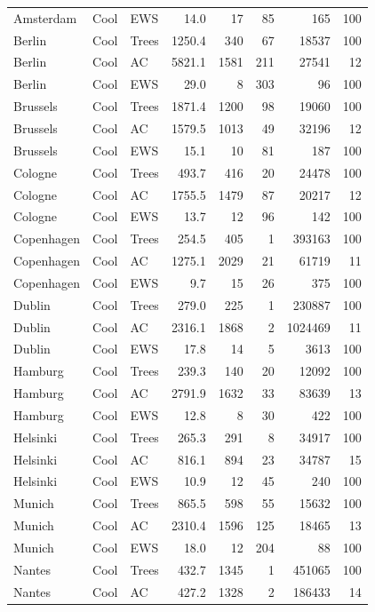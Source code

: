 \begin{longtable}{lllrrrrr}
  Amsterdam & Cool & EWS & 14.0 & 17 & 85 & 165 & 100 \\ 
  Berlin & Cool & Trees & 1250.4 & 340 & 67 & 18537 & 100 \\ 
  Berlin & Cool & AC & 5821.1 & 1581 & 211 & 27541 & 12 \\ 
  Berlin & Cool & EWS & 29.0 & 8 & 303 & 96 & 100 \\ 
  Brussels & Cool & Trees & 1871.4 & 1200 & 98 & 19060 & 100 \\ 
  Brussels & Cool & AC & 1579.5 & 1013 & 49 & 32196 & 12 \\ 
  Brussels & Cool & EWS & 15.1 & 10 & 81 & 187 & 100 \\ 
  Cologne & Cool & Trees & 493.7 & 416 & 20 & 24478 & 100 \\ 
  Cologne & Cool & AC & 1755.5 & 1479 & 87 & 20217 & 12 \\ 
  Cologne & Cool & EWS & 13.7 & 12 & 96 & 142 & 100 \\ 
  Copenhagen & Cool & Trees & 254.5 & 405 & 1 & 393163 & 100 \\ 
  Copenhagen & Cool & AC & 1275.1 & 2029 & 21 & 61719 & 11 \\ 
  Copenhagen & Cool & EWS & 9.7 & 15 & 26 & 375 & 100 \\ 
  Dublin & Cool & Trees & 279.0 & 225 & 1 & 230887 & 100 \\ 
  Dublin & Cool & AC & 2316.1 & 1868 & 2 & 1024469 & 11 \\ 
  Dublin & Cool & EWS & 17.8 & 14 & 5 & 3613 & 100 \\ 
  Hamburg & Cool & Trees & 239.3 & 140 & 20 & 12092 & 100 \\ 
  Hamburg & Cool & AC & 2791.9 & 1632 & 33 & 83639 & 13 \\ 
  Hamburg & Cool & EWS & 12.8 & 8 & 30 & 422 & 100 \\ 
  Helsinki & Cool & Trees & 265.3 & 291 & 8 & 34917 & 100 \\ 
  Helsinki & Cool & AC & 816.1 & 894 & 23 & 34787 & 15 \\ 
  Helsinki & Cool & EWS & 10.9 & 12 & 45 & 240 & 100 \\ 
  Munich & Cool & Trees & 865.5 & 598 & 55 & 15632 & 100 \\ 
  Munich & Cool & AC & 2310.4 & 1596 & 125 & 18465 & 13 \\ 
  Munich & Cool & EWS & 18.0 & 12 & 204 & 88 & 100 \\ 
  Nantes & Cool & Trees & 432.7 & 1345 & 1 & 451065 & 100 \\ 
  Nantes & Cool & AC & 427.2 & 1328 & 2 & 186433 & 14 \\ 

\end{longtable}
